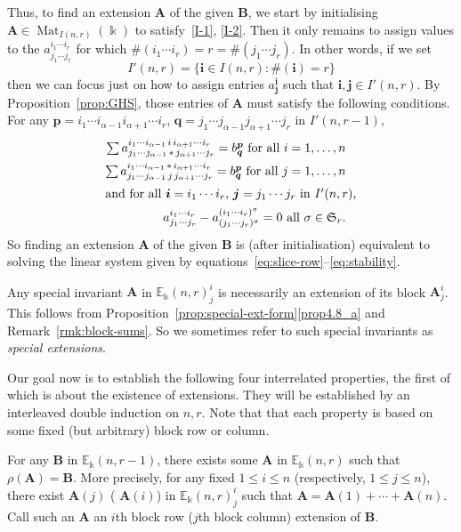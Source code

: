 \documentclass[ALCO,ThmDefs,Unicode,epreuves]{cedram}
\DeclareMathOperator{\Mat}{Mat}
\newcommand{\E}{\mathbb{E}}
\newcommand{\Sym}{\mathfrak{S}}
\newcommand{\bi}{{\boldsymbol{i}}} %
\newcommand{\bj}{{\boldsymbol{j}}}
\newcommand{\bp}{{\boldsymbol{p}}}
\newcommand{\bq}{{\boldsymbol{q}}}
\newcommand{\bA}{\mathbf{A}}
\newcommand{\bB}{\mathbf{B}}
\begin{document}
Thus, to find an extension $\bA$ of the given $\bB$, we start by
initialising $\bA \in \Mat_{I(n,r)}(\Bbbk)$ to satisfy~\eqref{I-1},
\eqref{I-2}. Then it only remains to assign values to the $a^{i_1 \cdots
 i_r}_{j_1 \cdots j_r}$ for which $\#(i_1 \cdots i_r) = r = \#(j_1
\cdots j_r)$. In other words, if we set
\[
I'(n,r) = \{\bi \in I(n,r): \#(\bi) = r\}
\]
then we can focus just on how to assign entries $a^\bi_\bj$ such that
$\bi,\bj \in I'(n,r)$. By Proposition~\ref{prop:GHS}, those entries of
$\bA$ must satisfy the following conditions. For any $\bp = i_1
\cdots i_{\alpha-1} i_{\alpha+1} \cdots i_r$, $\bq = j_1 \cdots
j_{\alpha-1} j_{\alpha+1} \cdots j_r$ in $I'(n,r-1)$,
\begin{align}
\textstyle \sum a^{i_1\cdots i_{\alpha-1} \, i
 \, i_{\alpha+1}\cdots i_r}_{j_1\cdots j_{\alpha-1} \,*\,
 j_{\alpha+1}\cdots j_r} = b^\bp_\bq \text{ for all } i = 1, \dots,
n\label{eq:slice-row} \\
\textstyle \sum a^{i_1\cdots i_{\alpha-1} \,*\, i_{\alpha+1}\cdots
 i_r}_{j_1\cdots j_{\alpha-1} \, j \, j_{\alpha+1}\cdots j_r} =
b^\bp_\bq \text{ for all } j = 1, \dots,
n \label{eq:slice-col}\\
\intertext{and for all $\bi = i_1 \cdots i_r$,
 $\bj = j_1 \cdots j_r$ in $I'(n,r)$,}
a^{i_1 \cdots i_r}_{j_1 \cdots j_r} - a^{(i_1 \cdots
 i_r)^\sigma}_{(j_1 \cdots j_r)^\sigma} = 0 \text{ all } \sigma \in
\Sym_r \label{eq:stability}.
\end{align}
So finding an extension $\bA$ of the given $\bB$ is (after
initialisation) equivalent to solving the linear system given by
equations~\eqref{eq:slice-row}--\eqref{eq:stability}.

Any special invariant $\bA$ in $\E_\Bbbk(n,r)^i_j$ is necessarily an
extension of its block $\bA^i_j$. This follows from Proposition~\ref{prop:special-ext-form}\ref{prop4.8_a} and Remark~\ref{rmk:block-sums}. So we
sometimes refer to such special invariants as \emph{special
 extensions}.

Our goal now is to establish the following four interrelated
properties, the first of which is about the existence of
extensions. They will be established by an interleaved double
induction on $n,r$. Note that that each property is based on some
fixed (but arbitrary) block row or column.


\begin{property}\label{1}
 For any $\bB$ in $\E_\Bbbk(n,r-1)$, there exists some $\bA$ in
 $\E_\Bbbk(n,r)$ such that $\rho(\bA) = \bB$. More precisely, for any
 fixed $1\le i \le n$ \textup{(}respectively, $1 \le j \le
 n$\textup{)}, there exist $\bA(j)$ \textup{(}\resp
 $\bA(i)$\textup{)} in $\E_\Bbbk(n,r)^i_j$ such that $\bA = \bA(1) +
 \cdots + \bA(n)$. Call such an $\bA$ an $i$th block row
 \textup{(}\resp $j$th block column\textup{)} extension of $\bB$.
\end{property}
\end{document}
